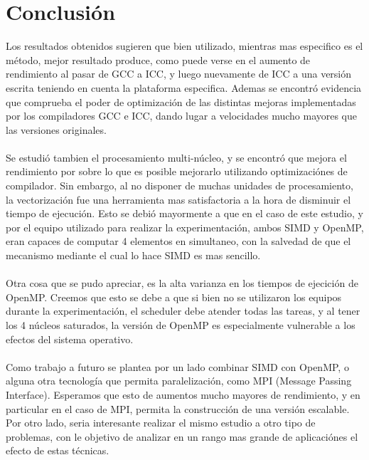 \section{Conclusión}%





Los resultados obtenidos sugieren que bien utilizado, mientras mas especifico es el método, mejor resultado produce, como puede verse en el aumento de rendimiento al pasar de GCC a ICC, y luego nuevamente de ICC a una versión escrita teniendo en cuenta la plataforma especifica. Ademas se encontró evidencia que comprueba el poder de optimización de las distintas mejoras implementadas por los compiladores GCC e ICC, dando lugar a velocidades mucho mayores que las versiones originales. 
~\\
~\\
Se estudió tambien el procesamiento multi-núcleo, y se encontró que mejora el rendimiento por sobre lo que es posible mejorarlo utilizando optimizaciónes de compilador. Sin embargo, al no disponer de muchas unidades de procesamiento, la vectorización fue una herramienta mas satisfactoria a la hora de disminuir el tiempo de ejecución. Esto se debió mayormente a que en el caso de este estudio, y por el equipo utilizado para realizar la experimentación, ambos SIMD y OpenMP, eran capaces de computar 4 elementos en simultaneo, con la salvedad de que el mecanismo mediante el cual lo hace SIMD es mas sencillo.
~\\
~\\
 Otra cosa que se pudo apreciar, es la alta varianza en los tiempos de ejecición de OpenMP. Creemos que esto se debe a que si bien no se utilizaron los equipos durante la experimentación, el scheduler debe atender todas las tareas, y al tener los 4 núcleos saturados, la versión de OpenMP es especialmente vulnerable a los efectos del sistema operativo.
~\\
~\\
Como trabajo a futuro se plantea por un lado combinar SIMD con OpenMP, o alguna otra tecnología que permita paralelización, como MPI (Message Passing Interface). Esperamos que esto de aumentos mucho mayores de rendimiento, y en particular en el caso de MPI, permita la construcción de una versión escalable. Por otro lado, seria interesante realizar el mismo estudio a otro tipo de problemas, con le objetivo de analizar en un rango mas grande de aplicaciónes el efecto de estas técnicas.